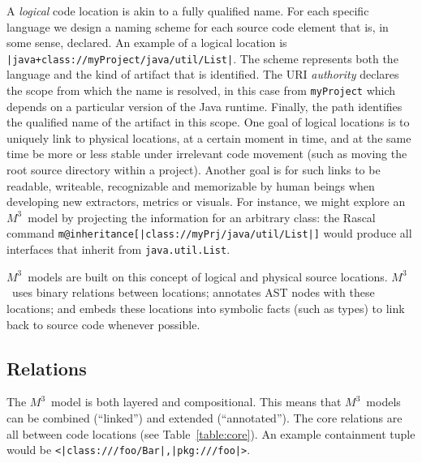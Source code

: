 \documentclass[conference]{IEEEtran}
\newcommand{\loc}[1]{\small{\texttt{#1}}\xspace}
\newcommand{\mthree}{\ensuremath{M^3}\!\xspace}
\begin{document}
A \emph{logical} code location is akin to a fully qualified name. For each
specific language we design a naming scheme for each source code element that
is, in some sense, declared. An example of a logical location is
\loc{|java+class://myProject/java/util/List|}. The scheme represents both the
language and the kind of artifact that is identified. The URI
\textit{authority} declares the scope from which the name is resolved, in this
case from \texttt{myProject} which depends on a particular version of the Java
runtime. Finally, the path identifies the qualified name of the artifact in
this scope. One goal of logical locations is to uniquely link to physical
locations, at a certain moment in time, and at the same time be more or less
stable under irrelevant code movement (such as moving the root source
directory within a project). Another goal is for such links to be readable,
writeable, recognizable and memorizable by human beings when developing new
extractors, metrics or visuals. For instance, we might explore an \mthree\
model by projecting the information for an arbitrary class: the Rascal command
\texttt{m@inheritance[|class://myPrj/java/util/List|]} would produce all
interfaces that inherit from \verb|java.util.List|.


\mthree\ models are built on this concept of logical and physical source
locations. \mthree\ uses binary relations between locations; annotates AST nodes
with these locations; and embeds these locations into symbolic facts (such
as types) to link back to source code whenever possible.

\subsection{Relations} The \mthree\  model is both layered and compositional.
This means that \mthree\ models can be combined (``linked'') and extended
(``annotated''). The core relations are all between code locations (see
Table~\ref{table:core}). An example containment tuple would be
\loc{<|class:///foo/Bar|,|pkg:///foo|>}.
\end{document}
